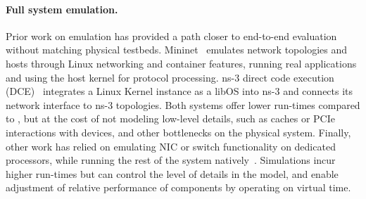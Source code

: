 \paragraph{Full system emulation.}
Prior work on emulation has provided a path closer to end-to-end
evaluation without matching physical testbeds.
%
Mininet~\cite{lantz:mininet} emulates network topologies and hosts
through Linux networking and container features, running real
applications and using the host kernel for protocol processing.
%
ns-3 direct code execution (DCE)~\cite{tazaki:dce} integrates a
Linux Kernel instance as a libOS into ns-3 and connects its
network interface to ns-3 topologies.
%
Both systems offer lower run-times compared to \sysname, but at the cost of not
modeling low-level details, such as caches or PCIe interactions with devices, and
other bottlenecks on the physical system.
%
Finally, other work has relied on emulating NIC or switch
functionality on dedicated processors, while running the rest of the
system natively~\cite{kaufmann:flexnic,li:nopaxos}.
%
Simulations incur higher run-times but can control the level of details in the
model, and enable adjustment of relative performance of components by operating
on virtual time.

